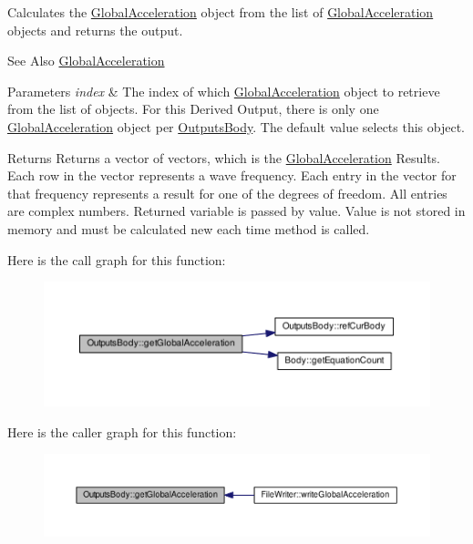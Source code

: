 Calculates the \hyperlink{class_global_acceleration}{Global\-Acceleration} object from the list of \hyperlink{class_global_acceleration}{Global\-Acceleration} objects and returns the output. 

\begin{DoxySeeAlso}{See Also}
\hyperlink{class_global_acceleration}{Global\-Acceleration} 
\end{DoxySeeAlso}

\begin{DoxyParams}{Parameters}
{\em index} & The index of which \hyperlink{class_global_acceleration}{Global\-Acceleration} object to retrieve from the list of objects. For this Derived Output, there is only one \hyperlink{class_global_acceleration}{Global\-Acceleration} object per \hyperlink{class_outputs_body}{Outputs\-Body}. The default value selects this object. \\
\hline
\end{DoxyParams}
\begin{DoxyReturn}{Returns}
Returns a vector of vectors, which is the \hyperlink{class_global_acceleration}{Global\-Acceleration} Results. Each row in the vector represents a wave frequency. Each entry in the vector for that frequency represents a result for one of the degrees of freedom. All entries are complex numbers. Returned variable is passed by value. Value is not stored in memory and must be calculated new each time method is called. 
\end{DoxyReturn}


Here is the call graph for this function\-:\nopagebreak
\begin{figure}[H]
\begin{center}
\leavevmode
\includegraphics[width=350pt]{class_outputs_body_a9c4de0023e30be8e03c4f910a3848bdc_cgraph}
\end{center}
\end{figure}




Here is the caller graph for this function\-:\nopagebreak
\begin{figure}[H]
\begin{center}
\leavevmode
\includegraphics[width=350pt]{class_outputs_body_a9c4de0023e30be8e03c4f910a3848bdc_icgraph}
\end{center}
\end{figure}


